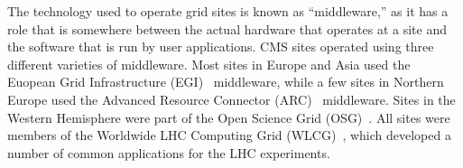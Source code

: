 The technology used to operate grid sites is known as ``middleware,'' as it
has a role that is somewhere between the actual hardware that operates at a
site and the software that is run by user applications.  CMS sites operated
using three different varieties of middleware.  Most sites in Europe and
Asia used the Euopean Grid Infrastructure (EGI)~\cite{EGI} middleware,
while a few sites in Northern Europe used the Advanced Resource Connector
(ARC)~\cite{ARC} middleware.  Sites in the Western Hemisphere were part of
the Open Science Grid (OSG)~\cite{OSG}.  All sites were members of the
Worldwide LHC Computing Grid (WLCG)~\cite{WLCG}, which developed a number
of common applications for the LHC experiments.

